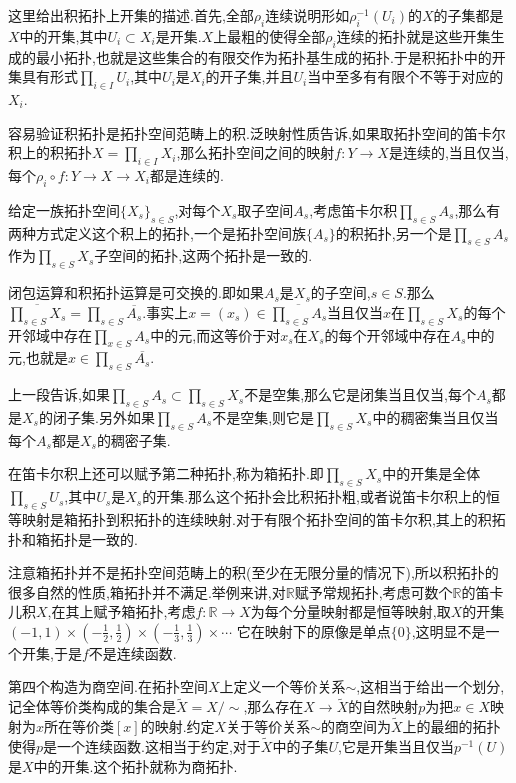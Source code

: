 这里给出积拓扑上开集的描述.首先,全部$\rho_i$连续说明形如$\rho_i^{-1}(U_i)$的$X$的子集都是$X$中的开集,其中$U_i\subset X_i$是开集.$X$上最粗的使得全部$\rho_i$连续的拓扑就是这些开集生成的最小拓扑,也就是这些集合的有限交作为拓扑基生成的拓扑.于是积拓扑中的开集具有形式$\prod_{i\in I}U_i$,其中$U_i$是$X_i$的开子集,并且$U_i$当中至多有有限个不等于对应的$X_i$.

容易验证积拓扑是拓扑空间范畴上的积.泛映射性质告诉,如果取拓扑空间的笛卡尔积上的积拓扑$X=\prod_{i\in I}X_i$,那么拓扑空间之间的映射$f:Y\to X$是连续的,当且仅当,每个$\rho_i\circ f:Y\to X\to X_i$都是连续的.

给定一族拓扑空间$\{X_s\}_{s\in S}$,对每个$X_s$取子空间$A_s$,考虑笛卡尔积$\prod_{s\in S}A_s$,那么有两种方式定义这个积上的拓扑,一个是拓扑空间族$\{A_s\}$的积拓扑,另一个是$\prod_{s\in S}A_s$作为$\prod_{s\in S}X_s$子空间的拓扑,这两个拓扑是一致的.

闭包运算和积拓扑运算是可交换的.即如果$A_s$是$X_s$的子空间,$s\in S$.那么$\overline{\prod_ {s\in S}X_s}=\prod_{s\in S}\overline{A_s}$.事实上$x=(x_s)\in\overline{\prod_{s\in S}A_s}$当且仅当$x$在$\prod_{s\in S}X_s$的每个开邻域中存在$\prod_{x\in S}A_s$中的元,而这等价于对$x_s$在$X_s$的每个开邻域中存在$A_s$中的元,也就是$x\in\prod_{s\in S}\overline{A_s}$.

上一段告诉,如果$\prod_{s\in S}A_s\subset\prod_{s\in S}X_s$不是空集,那么它是闭集当且仅当,每个$A_s$都是$X_s$的闭子集.另外如果$\prod_{s\in S}A_s$不是空集,则它是$\prod_{s\in S}X_s$中的稠密集当且仅当每个$A_s$都是$X_s$的稠密子集.

在笛卡尔积上还可以赋予第二种拓扑,称为箱拓扑.即$\prod_{s\in S}X_s$中的开集是全体$\prod_{s\in S}U_s$,其中$U_s$是$X_s$的开集.那么这个拓扑会比积拓扑粗,或者说笛卡尔积上的恒等映射是箱拓扑到积拓扑的连续映射.对于有限个拓扑空间的笛卡尔积,其上的积拓扑和箱拓扑是一致的.

注意箱拓扑并不是拓扑空间范畴上的积(至少在无限分量的情况下),所以积拓扑的很多自然的性质,箱拓扑并不满足.举例来讲,对$\mathbb{R}$赋予常规拓扑,考虑可数个$\mathbb{R}$的笛卡儿积$X$,在其上赋予箱拓扑,考虑$f:\mathbb{R}\to X$为每个分量映射都是恒等映射,取$X$的开集$(-1,1)\times(-\frac{1} {2},\frac{1}{2})\times(-\frac{1}{3},\frac{1}{3})\times\cdots$
它在映射下的原像是单点$\{0\}$,这明显不是一个开集,于是$f$不是连续函数.

第四个构造为商空间.在拓扑空间$X$上定义一个等价关系$\sim$,这相当于给出一个划分,记全体等价类构成的集合是$\widetilde{X}=X/\sim$,那么存在$X\to\widetilde{X}$的自然映射$p$为把$x\in X$映射为$x$所在等价类$[x]$的映射.约定$X$关于等价关系$\sim$的商空间为$\widetilde{X}$上的最细的拓扑使得$p$是一个连续函数.这相当于约定,对于$\widetilde{X}$中的子集$U$,它是开集当且仅当$p^{-1}(U)$是$X$中的开集.这个拓扑就称为商拓扑.

